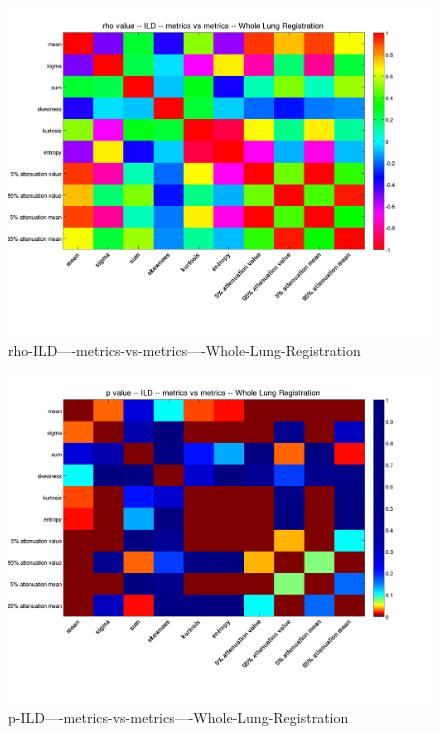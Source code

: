 \documentclass[12pt]{article}
\begin{document}
\begin{figure}
    \includegraphics[width=0.84\linewidth,viewport=100 60 620 550]{corr/rho-ILD----metrics-vs-metrics----Whole-Lung-Registration.png}
    \caption{rho-ILD----metrics-vs-metrics----Whole-Lung-Registration}
    \label{fig:rho-ILD----metrics-vs-metrics----Whole-Lung-Registration}
\end{figure}
\begin{figure}
    \includegraphics[width=0.84\linewidth,viewport=100 60 620 550]{corr/p-ILD----metrics-vs-metrics----Whole-Lung-Registration.png}
    \caption{p-ILD----metrics-vs-metrics----Whole-Lung-Registration}
    \label{fig:p-ILD----metrics-vs-metrics----Whole-Lung-Registration}
\end{figure}
\end{document}
